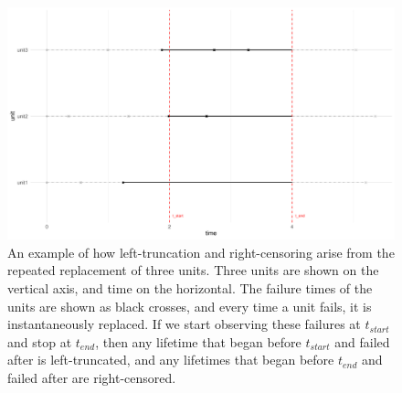 \begin{figure}
    \centering
    \includegraphics[width=1\textwidth]{./figures/ch-2/left_truncation_w_right_censoring_example.pdf}
    \caption{An example of how left-truncation and right-censoring arise from the repeated replacement of three units. Three units are shown on the vertical axis, and time on the horizontal. The failure times of the units are shown as black crosses, and every time a unit fails, it is instantaneously replaced. If we start observing these failures at $t_{start}$ and stop at $t_{end}$, then any lifetime that began before $t_{start}$ and failed after is left-truncated, and any lifetimes that began before $t_{end}$ and failed after are right-censored.}
    \label{fig:left_trunc_and_right_cens_example}
\end{figure}

